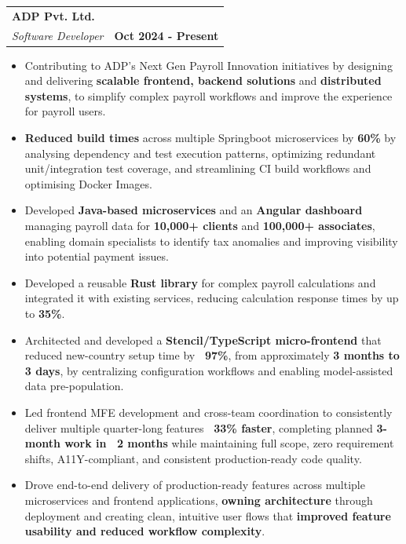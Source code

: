 \documentclass[8pt,a4paper]{article}
\makeatletter
\newcommand{\job}[2]{%
  \vspace{1pt}
  \begin{tabularx}{\linewidth}{@{}X>{\raggedleft\arraybackslash}p{1.7in}@{}}
    #1 & \textbf{#2}
  \end{tabularx}
}
\makeatother
\begin{document}
\job{\textbf{ADP Pvt. Ltd.}\\[2pt]\textit{Software Developer}}{Oct 2024 - Present}
\begin{itemize}
    \item Contributing to ADP’s Next Gen Payroll Innovation initiatives by designing and delivering \textbf{scalable frontend, backend solutions} and \textbf{distributed systems}, to simplify complex payroll workflows and improve the experience for payroll users.
    \item \textbf{Reduced build times} across multiple Springboot microservices by \textbf{60\%} by analysing dependency and test execution patterns, optimizing redundant unit/integration test coverage, and streamlining CI build workflows and optimising Docker Images.
    \item Developed \textbf{Java-based microservices} and an \textbf{Angular dashboard} managing payroll data for \textbf{10,000+ clients} and \textbf{100,000+ associates}, enabling domain specialists to identify tax anomalies and improving visibility into potential payment issues.
    \item Developed a reusable \textbf{Rust library} for complex payroll calculations and integrated it with existing services, reducing calculation response times by up to \textbf{35\%}.
    \item Architected and developed a \textbf{Stencil/TypeScript micro-frontend} that reduced new-country setup time by \textbf{~97\%}, from approximately \textbf{3 months to 3 days}, by centralizing configuration workflows and enabling model-assisted data pre-population.
    \item Led frontend MFE development and cross-team coordination to consistently deliver multiple quarter-long features \textbf{~33\% faster}, completing planned \textbf{3-month work in ~2 months} while maintaining full scope, zero requirement shifts, A11Y-compliant, and consistent production-ready code quality.
    \item Drove end-to-end delivery of production-ready features across multiple microservices and frontend applications, \textbf{owning architecture} through deployment and creating clean, intuitive user flows that \textbf{improved feature usability and reduced workflow complexity}.
\end{itemize}
\end{document}
